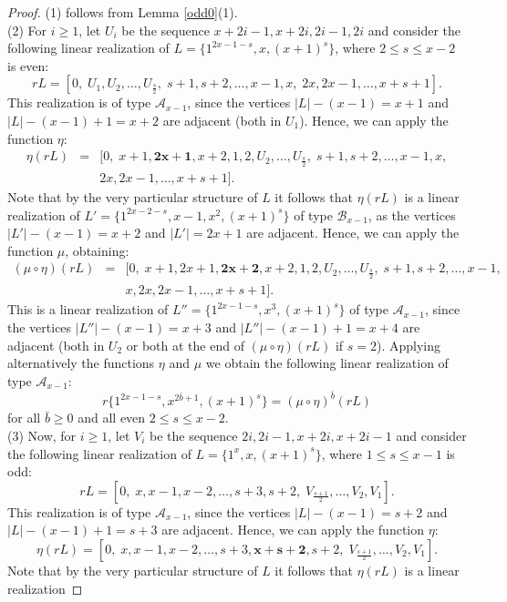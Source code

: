 \documentclass{amsart}
\theoremstyle{definition}
\numberwithin{equation}{section}
\def\A{\mathcal{A}}
\def\B{\mathcal{B}}
\begin{document}
\begin{proof}
(1) follows from Lemma \ref{odd0}(1).\\
(2) For $i\geq 1$, let $U_i$ be the sequence $x+2i-1,  x+2i,  2i-1, 2i$ and  consider the following linear
realization of $L=\{1^{2x-1-s}, x, (x+1)^s\}$, where $2\leq s\leq x-2$ is even:
$$rL=[0,\; U_1, U_2,\ldots,U_{\frac{s}{2}},\;s+1,s+2,\ldots, x-1,x,\; 2x,2x-1,\ldots, x+s+1].$$
This realization is of type $\A_{x-1}$, since the vertices $|L|-(x-1) = x+1$ and $|L|-(x-1) + 1=x+2$ are adjacent
(both in $U_1$).  Hence, we  can apply the function $\eta$:
$$\begin{array}{rcl}
\eta(rL) & =&  [0,\; x+1, \bm{2x+1}, x+2, 1,2, U_2,\ldots,U_{\frac{s}{2}},\;s+1,s+2,\ldots, x-1,x, \\
&&2x,2x-1,\ldots, x+s+1    ].
\end{array}$$
Note that by the very particular structure of $L$ it follows that $\eta(rL)$ is a linear realization
 of $L'=\{1^{2x-2-s},x-1, x^2, (x+1)^s\}$ of type $\B_{x-1}$, as the vertices $|L'|-(x-1)=x+2$ and $|L'|=2x+1$ are
adjacent. Hence, we can apply the function $\mu$, obtaining:
 $$\begin{array}{rcl}
 (\mu\circ\eta)(rL) &= & [ 0,\; x+1, 2x+1,\bm{2x+2}, x+2, 1,2, U_2,\ldots,U_{\frac{s}{2}},\;s+1,s+2,\ldots, x-1,\\
 && x, 2x,2x-1,\ldots, x+s+1  ].
\end{array}$$
This is a linear realization of $L''=\{1^{2x-1-s}, x^3, (x+1)^s\}$  of type $\A_{x-1}$, since
 the vertices $|L''|-(x-1)=x+3$ and $|L''|-(x-1)+1=x+4$ are adjacent (both in $U_2$ or both at the end of
$(\mu\circ\eta)(rL)$ if $s=2$).
 Applying alternatively the functions $\eta$ and $\mu$ we obtain the following linear realization of type $\A_{x-1}$:
$$r\{ 1^{2x-1-s}, x^{2\bar b+1}, (x+1)^s  \}=(\mu \circ \eta)^{\bar b} (rL)$$
 for all $\bar b\geq 0$ and all even $2\leq s\leq x-2$. \\
(3) Now, for $i\geq 1$, let $V_i$ be the sequence $2i,2i-1, x+2i,x+2i-1$ and  consider the following linear
realization of $L=\{1^{x},x, (x+1)^s\}$, where $1\leq s\leq x-1$ is odd:
$$rL=[0,\; x, x-1,x-2,\ldots,s+3, s+2, \;  V_{\frac{s+1}{2}}, \ldots,V_2,V_1].$$
This realization is  of type $\A_{x-1}$, since the vertices $|L|-(x-1) = s+2$ and $|L|-(x-1) + 1=s+3$ are adjacent.
Hence, we can apply the function $\eta$:
$$\eta(rL) = [0,\; x, x-1,x-2,\ldots,s+3, \bm{x+s+2}, s+2, \;  V_{\frac{s+1}{2}}, \ldots,V_2,V_1   ].$$
Note that by the very particular structure of $L$ it follows that $\eta(rL)$ is a linear realization

\end{proof}
\end{document}
